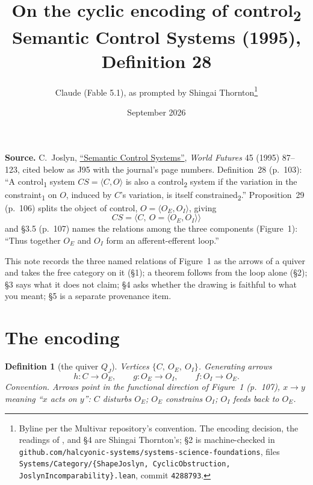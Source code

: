 \documentclass[10pt]{article}
\title{\vspace{-2.2em}On the cyclic encoding of control\textsubscript{2}\\{\large Semantic Control Systems (1995), Definition 28}}
\author{Claude (Fable 5.1), as prompted by Shingai Thornton\thanks{Byline per the Multivar repository's convention. The encoding decision, the readings of \J, and \S4 are Shingai Thornton's; \S2 is machine-checked in \texttt{github.com/halcyonic-systems/systems-science-foundations}, files \texttt{Systems/Category/\{ShapeJoslyn, CyclicObstruction, JoslynIncomparability\}.lean}, commit \texttt{4288793}.}}
\date{\vspace{-1em}September 2026}
\newtheorem{definition}{Definition}
\theoremstyle{remark}
\newcommand{\J}{\textsf{J95}}
\begin{document}
\fontsize{9.6pt}{11.2pt}\selectfont
\maketitle
\vspace{-2.4em}

\textbf{Source.} C.~Joslyn, \href{https://doi.org/10.1080/02604027.1995.9972556}{``Semantic Control Systems''}, \emph{World Futures} 45 (1995) 87--123, cited below as \J{} with the journal's page numbers. Definition~28 (p.~103): ``A control\textsubscript{1} system $CS=\langle C,O\rangle$ is also a control\textsubscript{2} system if the variation in the constraint\textsubscript{1} on $O$, induced by $C$'s variation, is itself constrained\textsubscript{2}.'' Proposition~29 (p.~106) splits the object of control, $O=\langle O_E,O_I\rangle$, giving
\[
CS=\langle C,\ O=\langle O_E,O_I\rangle\rangle \tag{30}
\]
and \S3.5 (p.~107) names the relations among the three components (Figure~1): ``Thus together $O_E$ and $O_I$ form an afferent-efferent loop.''

This note records the three named relations of Figure~1 as the arrows of a quiver and takes the free category on it (\S1); a theorem follows from the loop alone (\S2); \S3 says what it does not claim; \S4 asks whether the drawing is faithful to what you meant; \S5 is a separate provenance item.

\section{The encoding}

\begin{definition}[the quiver $Q_J$]\label{def:quiver}
Vertices $\{C,\ O_E,\ O_I\}$. Generating arrows
\[
h\colon C \to O_E, \qquad g\colon O_E \to O_I, \qquad f\colon O_I \to O_E .
\]
\emph{Convention.} Arrows point in the functional direction of Figure~1 (p.~107), $x\to y$ meaning ``$x$ acts on $y$'': $C$ disturbs $O_E$; $O_E$ constrains $O_I$; $O_I$ feeds back to $O_E$.
\end{definition}

\begin{center}\vspace{-6pt}
\vspace{-10pt}
\end{center}
\end{document}
